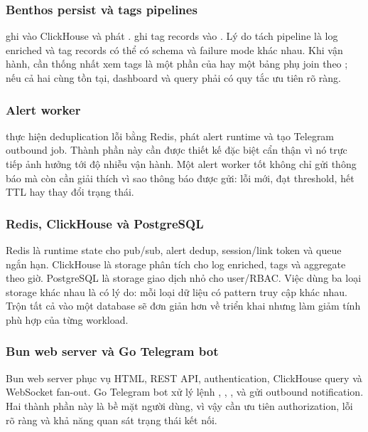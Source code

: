 \subsubsection{Benthos persist và tags pipelines}

 ghi  vào ClickHouse và phát .  ghi tag records vào . Lý do tách pipeline là log enriched và tag records có thể có schema và failure mode khác nhau. Khi vận hành, cần thống nhất xem tags là một phần của  hay một bảng phụ join theo ; nếu cả hai cùng tồn tại, dashboard và query phải có quy tắc ưu tiên rõ ràng.

\subsubsection{Alert worker}

 thực hiện deduplication lỗi bằng Redis, phát alert runtime và tạo Telegram outbound job. Thành phần này cần được thiết kế đặc biệt cẩn thận vì nó trực tiếp ảnh hưởng tới độ nhiễu vận hành. Một alert worker tốt không chỉ gửi thông báo mà còn cần giải thích vì sao thông báo được gửi: lỗi mới, đạt threshold, hết TTL hay thay đổi trạng thái.

\subsubsection{Redis, ClickHouse và PostgreSQL}

Redis là runtime state cho pub/sub, alert dedup, session/link token và queue ngắn hạn. ClickHouse là storage phân tích cho log enriched, tags và aggregate theo giờ. PostgreSQL là storage giao dịch nhỏ cho user/RBAC. Việc dùng ba loại storage khác nhau là có lý do: mỗi loại dữ liệu có pattern truy cập khác nhau. Trộn tất cả vào một database sẽ đơn giản hơn về triển khai nhưng làm giảm tính phù hợp của từng workload.

\subsubsection{Bun web server và Go Telegram bot}

Bun web server phục vụ HTML, REST API, authentication, ClickHouse query và WebSocket fan-out. Go Telegram bot xử lý lệnh , , ,  và gửi outbound notification. Hai thành phần này là bề mặt người dùng, vì vậy cần ưu tiên authorization, lỗi rõ ràng và khả năng quan sát trạng thái kết nối.


